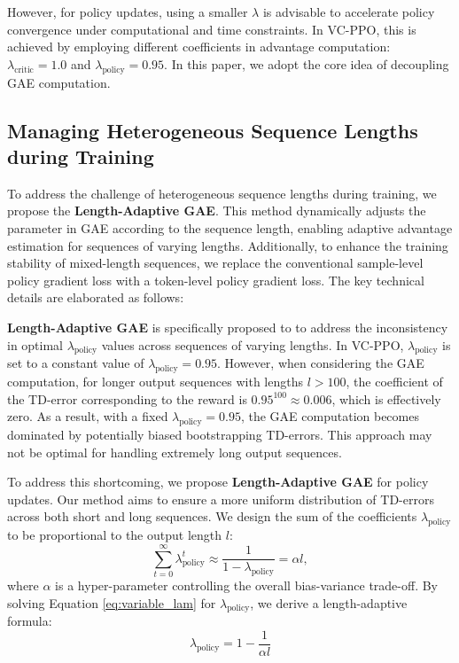 However, for policy updates, using a smaller $\lambda$ is advisable to accelerate policy convergence under computational and time constraints. In VC-PPO, this is achieved by employing different coefficients in advantage computation: $\lambda_{\text{critic}} = 1.0$ and $\lambda_{\text{policy}} = 0.95$. In this paper, we adopt the core idea of decoupling GAE computation. 

\subsection{Managing Heterogeneous Sequence Lengths during Training}
To address the challenge of heterogeneous sequence lengths during training, we propose the \textbf{Length-Adaptive GAE}. This method dynamically adjusts the parameter in GAE according to the sequence length, enabling adaptive advantage estimation for sequences of varying lengths. Additionally, to enhance the training stability of mixed-length sequences, we replace the conventional sample-level policy gradient loss with a token-level policy gradient loss. The key technical details are elaborated as follows:

\textbf{Length-Adaptive GAE} is specifically proposed to to address the inconsistency in optimal $\lambda_{\text{policy}}$ values across sequences of varying lengths. In VC-PPO, $\lambda_{\text{policy}}$ is set to a constant value of $\lambda_{\text{policy}}=0.95$. However, when considering the GAE computation, for longer output sequences with lengths $l>100$, the coefficient of the TD-error corresponding to the reward is $0.95^{100}\approx0.006$, which is effectively zero. As a result, with a fixed $\lambda_{\text{policy}} = 0.95$, the GAE computation becomes dominated by potentially biased bootstrapping TD-errors. This approach may not be optimal for handling extremely long output sequences.

To address this shortcoming, we propose \textbf{Length-Adaptive GAE} for policy updates. Our method aims to ensure a more uniform distribution of TD-errors across both short and long sequences. We design the sum of the coefficients $\lambda_{\text{policy}}$ to be proportional to the output length $l$:
\begin{equation}
\sum_{t = 0}^{\infty}\lambda_{\text{policy}}^t\approx\frac{1}{1-\lambda_{\text{policy}}}=\alpha l,
\label{eq:variable_lam}
\end{equation}
where $\alpha$ is a hyper-parameter controlling the overall bias-variance trade-off. By solving Equation \ref{eq:variable_lam} for $\lambda_{\text{policy}}$, we derive a length-adaptive formula:
\begin{equation}
\lambda_{\text{policy}} = 1-\frac{1}{\alpha l}
\end{equation}

